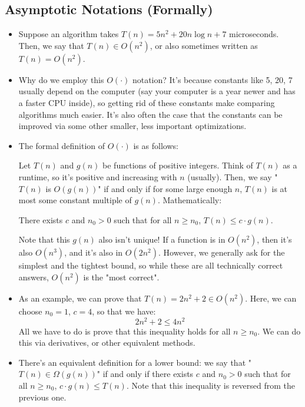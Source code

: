 \subsection{Asymptotic Notations (Formally)}
\begin{itemize}
	\item Suppose an algorithm takes \( T(n) = 5n^2 + 20n \log n + 7 \) microseconds. Then, we say that \( T(n) \in O(n^2) \), or 
		also sometimes written as \( T(n) = O(n^2) \).
	\item Why do we employ this \( O(\cdot) \) notation? It's because constants like 5, 20, 7 usually depend on the computer 
		(say your computer is a year newer and has a faster CPU inside), so getting rid of these constants make comparing algorithms
		much easier. It's also often the case that the constants can be improved via some other smaller, less important 
		optimizations. 
	\item The formal definition of \( O(\cdot) \) is as follows: 

		Let \( T(n) \) and \( g(n) \) be functions of positive integers. Think of \( T(n) \) as a runtime, so it's positive and 
		increasing with \( n \) (usually). Then, we say "\( T(n) \) is  \( O(g(n)) \)" if and only if for some large enough 
		\( n \), \( T(n) \) is at most some constant multiple of \( g(n) \). Mathematically:

		There exists \( c \) and \( n_0 > 0 \) such that for all \( n \ge  n_0\), \( T(n) \le  c \cdot g(n) \). 

		Note that this \( g(n) \) also isn't unique! If a function is in \( O(n^2) \), then it's also \( O(n^3) \), and it's 
		also in \( O(2n^2) \). However, we generally ask for the simplest and the tightest bound, so while these are 
		all technically correct answers, \( O(n^2) \) is the "most correct". 
	\item As an example, we can prove that \( T(n) = 2n^2 + 2 \in O(n^2)\). Here, we can choose \( n_0 = 1 \), \( c = 4 \), 
		so that we have: 
		\[
		2n^2 + 2 \le 4n^2
		\] 
		All we have to do is prove that this inequality holds for all \( n \ge  n_0 \). We can do this via derivatives, or other 
		equivalent methods. 
	\item There's an equivalent definition for a lower bound: we say that "\( T(n) \in \Omega(g(n)) \)" if and only if 
		there exists \( c \) and \( n_0 > 0 \) such that for all \( n \ge n_0 \), \( c \cdot g(n) \le T(n) \). Note that this 
		inequality is reversed from the previous one. 


\end{itemize}

